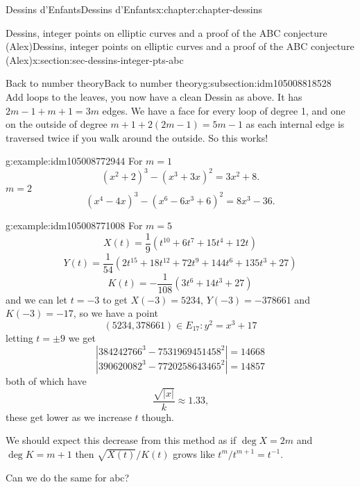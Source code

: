 \documentclass[oneside,10pt,]{book}
\numberwithin{equation}{section}
\newcommand{\inv}{^{-1}}
\begin{document}
\begin{chapterptx}{Dessins d'Enfants}{}{Dessins d'Enfants}{}{}{x:chapter:chapter-dessins}
\begin{sectionptx}{Dessins, integer points on elliptic curves and a proof of the ABC conjecture (Alex)}{}{Dessins, integer points on elliptic curves and a proof of the ABC conjecture (Alex)}{}{}{x:section:sec-dessins-integer-pts-abc}
\begin{subsectionptx}{Back to number theory}{}{Back to number theory}{}{}{g:subsection:idm105008818528}
\begin{equation*}
\end{equation*}
Add loops to the leaves, you now have a clean Dessin as above. It has \(2m- 1 + m + 1 = 3m\) edges. We have a face for every loop of degree 1, and one on the outside of degree \(m+ 1 +2(2m-1)  = 5m - 1\) as each internal edge is traversed twice if you walk around the outside. So this works!%
\begin{example}{}{g:example:idm105008772944}%
For \(m= 1\)%
\begin{equation*}
(x^2 + 2)^3 - (x^3 + 3x)^2 = 3x^2 + 8\text{.}
\end{equation*}
\(m= 2\)%
\begin{equation*}
(x^4 - 4x)^3 - (x^6 -6x^3+6)^2  = 8x^3 - 36\text{.}
\end{equation*}
%
\end{example}
\begin{example}{}{g:example:idm105008771008}%
For \(m =5\)%
\begin{equation*}
X(t) = \frac 19 (t^{10} + 6t^7 +15 t^4 + 12t)
\end{equation*}
%
\begin{equation*}
Y(t) = \frac{1}{54} (2t^{15} + 18t^{12} +72 t^9 + 144 t^6 + 135 t^3 + 27)
\end{equation*}
%
\begin{equation*}
K(t) = -\frac{1}{108} (3t^{6} + 14t^3 +27)
\end{equation*}
and we can let \(t = -3\) to get \(X(-3) = 5234\), \(Y(-3) = -378661\) and \(K(-3) = -17\), so we have a point%
\begin{equation*}
(5234, 378661) \in E_{17} \colon y^2 = x^3 + 17
\end{equation*}
letting \(t = \pm 9\) we get%
\begin{equation*}
|384242766^3 - 7531969451458^2| = 14668
\end{equation*}
%
\begin{equation*}
|390620082^3 - 7720258643465^2| = 14857
\end{equation*}
both of which have%
\begin{equation*}
\frac{\sqrt{|x|}}{k} \approx 1.33\text{,}
\end{equation*}
these get lower as we increase \(t\) though.%
\end{example}
We should expect this decrease from this method as if \(\deg X = 2m\) and \(\deg K = m + 1\) then \(\sqrt{X(t)}/K(t)\) grows like \(t^{m}/t^{m+1} = t\inv\).%
\par
Can we do the same for abc?%
\par

\end{subsectionptx}
\end{sectionptx}
\end{chapterptx}
\end{document}
